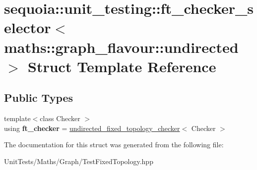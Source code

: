 \hypertarget{structsequoia_1_1unit__testing_1_1ft__checker__selector_3_01maths_1_1graph__flavour_1_1undirected_01_4}{}\section{sequoia\+::unit\+\_\+testing\+::ft\+\_\+checker\+\_\+selector$<$ maths\+::graph\+\_\+flavour\+::undirected $>$ Struct Template Reference}
\label{structsequoia_1_1unit__testing_1_1ft__checker__selector_3_01maths_1_1graph__flavour_1_1undirected_01_4}
\subsection*{Public Types}
\begin{DoxyCompactItemize}
\item 
\mbox{\label{structsequoia_1_1unit__testing_1_1ft__checker__selector_3_01maths_1_1graph__flavour_1_1undirected_01_4_ae3727c0da11f9ee35ec993c464a41967}} 
{\footnotesize template$<$class Checker $>$ }\\using {\bfseries ft\+\_\+checker} = \mbox{\hyperlink{classsequoia_1_1unit__testing_1_1undirected__fixed__topology__checker}{undirected\+\_\+fixed\+\_\+topology\+\_\+checker}}$<$ Checker $>$
\end{DoxyCompactItemize}


The documentation for this struct was generated from the following file\+:\begin{DoxyCompactItemize}
\item 
Unit\+Tests/\+Maths/\+Graph/Test\+Fixed\+Topology.\+hpp\end{DoxyCompactItemize}
